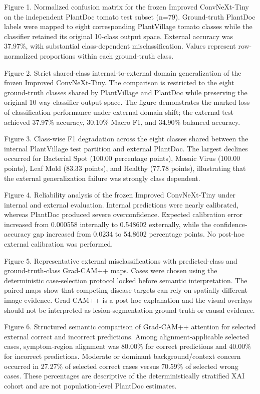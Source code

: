 \caption{Figure 1. Normalized confusion matrix for the frozen Improved ConvNeXt-Tiny on the independent PlantDoc tomato test subset (n=79). Ground-truth PlantDoc labels were mapped to eight corresponding PlantVillage tomato classes while the classifier retained its original 10-class output space. External accuracy was 37.97\%, with substantial class-dependent misclassification. Values represent row-normalized proportions within each ground-truth class.}

\caption{Figure 2. Strict shared-class internal-to-external domain generalization of the frozen Improved ConvNeXt-Tiny. The comparison is restricted to the eight ground-truth classes shared by PlantVillage and PlantDoc while preserving the original 10-way classifier output space. The figure demonstrates the marked loss of classification performance under external domain shift; the external test achieved 37.97\% accuracy, 30.10\% Macro F1, and 34.90\% balanced accuracy.}

\caption{Figure 3. Class-wise F1 degradation across the eight classes shared between the internal PlantVillage test partition and external PlantDoc. The largest declines occurred for Bacterial Spot (100.00 percentage points), Mosaic Virus (100.00 points), Leaf Mold (83.33 points), and Healthy (77.78 points), illustrating that the external generalization failure was strongly class dependent.}

\caption{Figure 4. Reliability analysis of the frozen Improved ConvNeXt-Tiny under internal and external evaluation. Internal predictions were nearly calibrated, whereas PlantDoc produced severe overconfidence. Expected calibration error increased from 0.000558 internally to 0.548602 externally, while the confidence-accuracy gap increased from 0.0234 to 54.8602 percentage points. No post-hoc external calibration was performed.}

\caption{Figure 5. Representative external misclassifications with predicted-class and ground-truth-class Grad-CAM++ maps. Cases were chosen using the deterministic case-selection protocol locked before semantic interpretation. The paired maps show that competing disease targets can rely on spatially different image evidence. Grad-CAM++ is a post-hoc explanation and the visual overlays should not be interpreted as lesion-segmentation ground truth or causal evidence.}

\caption{Figure 6. Structured semantic comparison of Grad-CAM++ attention for selected external correct and incorrect predictions. Among alignment-applicable selected cases, symptom-region alignment was 80.00\% for correct predictions and 40.00\% for incorrect predictions. Moderate or dominant background/context concern occurred in 27.27\% of selected correct cases versus 70.59\% of selected wrong cases. These percentages are descriptive of the deterministically stratified XAI cohort and are not population-level PlantDoc estimates.}

